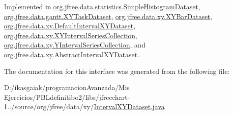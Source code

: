 Implemented in \mbox{\hyperlink{classorg_1_1jfree_1_1data_1_1statistics_1_1_simple_histogram_dataset_a90ea760c22d437e38065981fa87e0be3}{org.\+jfree.\+data.\+statistics.\+Simple\+Histogram\+Dataset}}, \mbox{\hyperlink{classorg_1_1jfree_1_1data_1_1gantt_1_1_x_y_task_dataset_a72a8034b2b668697fe4fb144f38f3806}{org.\+jfree.\+data.\+gantt.\+X\+Y\+Task\+Dataset}}, \mbox{\hyperlink{classorg_1_1jfree_1_1data_1_1xy_1_1_x_y_bar_dataset_acecbf0eedd803245aa43c76e0937fb6c}{org.\+jfree.\+data.\+xy.\+X\+Y\+Bar\+Dataset}}, \mbox{\hyperlink{classorg_1_1jfree_1_1data_1_1xy_1_1_default_interval_x_y_dataset_ac785b0168a489e325d773943bdbfb0e7}{org.\+jfree.\+data.\+xy.\+Default\+Interval\+X\+Y\+Dataset}}, \mbox{\hyperlink{classorg_1_1jfree_1_1data_1_1xy_1_1_x_y_interval_series_collection_ac95d13ee5b7dd702f9a9fdf7f78a79e9}{org.\+jfree.\+data.\+xy.\+X\+Y\+Interval\+Series\+Collection}}, \mbox{\hyperlink{classorg_1_1jfree_1_1data_1_1xy_1_1_y_interval_series_collection_a3f029817a3f87b12926083b76d0ce5e0}{org.\+jfree.\+data.\+xy.\+Y\+Interval\+Series\+Collection}}, and \mbox{\hyperlink{classorg_1_1jfree_1_1data_1_1xy_1_1_abstract_interval_x_y_dataset_a93b54cecb442bfe1e268d75c1e9a0fee}{org.\+jfree.\+data.\+xy.\+Abstract\+Interval\+X\+Y\+Dataset}}.



The documentation for this interface was generated from the following file\+:\begin{DoxyCompactItemize}
\item 
D\+:/ikasgaiak/programacion\+Avanzada/\+Mis Ejercicios/\+P\+B\+Ldefinitibo2/libs/jfreechart-\/1../source/org/jfree/data/xy/\mbox{\hyperlink{_interval_x_y_dataset_8java}{Interval\+X\+Y\+Dataset.\+java}}\end{DoxyCompactItemize}
